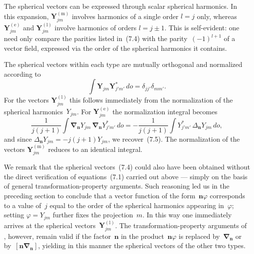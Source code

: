 The spherical vectors can be expressed through scalar spherical harmonics. In this expansion, $\mathbf{Y}_{jm}^{(\text{m})}$ involves harmonics of a single order $l = j$ only, whereas $\mathbf{Y}_{jm}^{(\text{e})}$ and $\mathbf{Y}_{jm}^{(\text{l})}$ involve harmonics of orders $l = j \pm 1$. This is self-evident: one need only compare the parities listed in~(7.4) with the parity~$(-1)^{l+1}$ of a vector field, expressed via the order of the spherical harmonics it contains.

The spherical vectors within each type are mutually orthogonal and normalized according to
\begin{equation}
\int \mathbf{Y}_{jm}\mathbf{Y}_{j'm'}^*\,do = \delta_{jj'}\delta_{mm'}.
\tag{7.5}
\end{equation}
For the vectors $\mathbf{Y}_{jm}^{(\text{l})}$ this follows immediately from the normalization of the spherical harmonics~$Y_{jm}$. For $\mathbf{Y}_{jm}^{(\text{e})}$ the normalization integral becomes
\[
\frac{1}{j(j+1)}\int \boldsymbol{\nabla}_\mathbf{n} Y_{jm}\,\boldsymbol{\nabla}_\mathbf{n} Y_{j'm'}^*\,do = -\frac{1}{j(j+1)}\int Y_{j'm'}^*\,\Delta_\mathbf{n} Y_{jm}\,do,
\]
and since $\Delta_\mathbf{n} Y_{jm} = -j(j+1)Y_{jm}$, we recover~(7.5). The normalization of the vectors $\mathbf{Y}_{jm}^{(\text{m})}$ reduces to an identical integral.

We remark that the spherical vectors~(7.4) could also have been obtained without the direct verification of equations~(7.1) carried out above --- simply on the basis of general transformation-property arguments. Such reasoning led us in the preceding section to conclude that a vector function of the form~$\mathbf{n}\varphi$ corresponds to a value of~$j$ equal to the order of the spherical harmonics appearing in~$\varphi$; setting $\varphi = Y_{jm}$ further fixes the projection~$m$. In this way one immediately arrives at the spherical vectors~$\mathbf{Y}_{jm}^{(\text{l})}$. The transformation-property arguments of , however, remain valid if the factor~$\mathbf{n}$ in the product~$\mathbf{n}\varphi$ is replaced by~$\boldsymbol{\nabla}_\mathbf{n}$ or by~$[\mathbf{n}\boldsymbol{\nabla}_\mathbf{n}]$, yielding in this manner the spherical vectors of the other two types.

